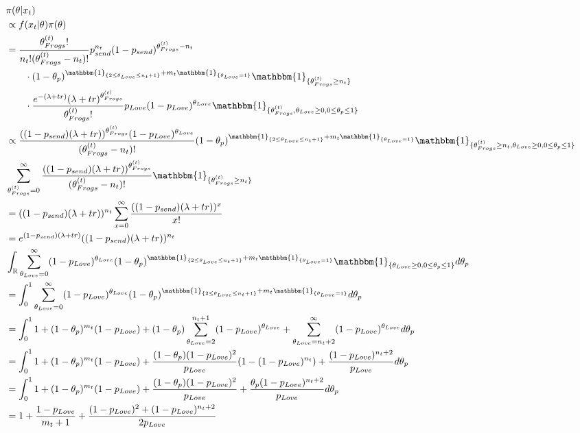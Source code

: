 \documentclass[10pt, a4paper]{article}
\begin{document}
    \begin{align*}
        &\pi(\theta|x_t) \\
        &\propto f(x_t|\theta)\pi(\theta) \\
        &= \frac{\theta_{Frogs}^{(t)}!}{n_t!(\theta_{Frogs}^{(t)}-n_t)!}p_{send}^{n_t}(1-p_{send})^{\theta_{Frogs}^{(t)}-n_t} \\&\qquad\cdot (1-\theta_p)^{\mathbbm{1}_{\{2\leq\theta_{Love}\leq n_t+1\}} + m_t\mathbbm{1}_{\{\theta_{Love} = 1\}}} \mathbbm{1}_{\{\theta_{Frogs}^{(t)}\geq n_t\}} \\&\qquad\cdot \frac{e^{-(\lambda+tr)}(\lambda+tr)^{\theta_{Frogs}^{(t)}}}{\theta_{Frogs}^{(t)}!}p_{Love}(1-p_{Love})^{\theta_{Love}} \mathbbm{1}_{\{\theta_{Frogs}^{(t)}, \theta_{Love}\geq 0, 0 \leq \theta_p \leq 1\}} \\
        &\propto \frac{((1-p_{send})(\lambda+tr))^{\theta_{Frogs}^{(t)}}(1-p_{Love})^{\theta_{Love}}}{(\theta_{Frogs}^{(t)}-n_t)!}(1-\theta_p)^{\mathbbm{1}_{\{2\leq\theta_{Love}\leq n_t+1\}} + m_t\mathbbm{1}_{\{\theta_{Love} = 1\}}}\mathbbm{1}_{\{\theta_{Frogs}^{(t)}\geq n_t, \theta_{Love}\geq 0, 0 \leq \theta_p \leq 1\}} \\
        &\sum_{\theta_{Frogs}^{(t)}=0}^{\infty} \frac{((1-p_{send})(\lambda+tr))^{\theta_{Frogs}^{(t)}}}{(\theta_{Frogs}^{(t)}-n_t)!}\mathbbm{1}_{\{\theta_{Frogs}^{(t)}\geq n_t\}} \\
        &= ((1-p_{send})(\lambda+tr))^{n_t}\sum_{x=0}^{\infty} \frac{((1-p_{send})(\lambda+tr))^x}{x!} \\
        &= e^{(1-p_{send})(\lambda+tr)}((1-p_{send})(\lambda+tr))^{n_t} \\
        &\int_{\mathbb{R}}\sum_{\theta_{Love}=0}^{\infty} (1-p_{Love})^{\theta_{Love}}(1-\theta_p)^{\mathbbm{1}_{\{2\leq\theta_{Love}\leq n_t+1\}} + m_t\mathbbm{1}_{\{\theta_{Love} = 1\}}} \mathbbm{1}_{\{\theta_{Love}\geq 0, 0 \leq \theta_p \leq 1\}}d\theta_p \\
        &= \int_0^1\sum_{\theta_{Love}=0}^{\infty}(1-p_{Love})^{\theta_{Love}}(1-\theta_p)^{\mathbbm{1}_{\{2\leq\theta_{Love}\leq n_t+1\}} + m_t\mathbbm{1}_{\{\theta_{Love} = 1\}}} d\theta_p \\
        &= \int_0^1 1 + (1-\theta_p)^{m_t}(1-p_{Love}) + (1-\theta_p)\sum_{\theta_{Love}=2}^{n_t+1}(1-p_{Love})^{\theta_{Love}} + \sum_{\theta_{Love}=n_t+2}^{\infty} (1-p_{Love})^{\theta_{Love}} d\theta_p \\
        &= \int_0^1 1 + (1-\theta_p)^{m_t}(1-p_{Love}) + \frac{(1-\theta_p)(1-p_{Love})^2}{p_{Love}}(1- (1-p_{Love})^{n_t}) + \frac{(1-p_{Love})^{n_t+2}}{p_{Love}} d\theta_p \\
        &= \int_0^1 1 + (1-\theta_p)^{m_t}(1-p_{Love}) + \frac{(1-\theta_p)(1-p_{Love})^2}{p_{Love}} + \frac{\theta_p(1-p_{Love})^{n_t+2}}{p_{Love}} d\theta_p \\
        &= 1 + \frac{1-p_{Love}}{m_t+1} + \frac{(1-p_{Love})^2 + (1-p_{Love})^{n_t+2}}{2p_{Love}} 
    \end{align*}
\end{document}
